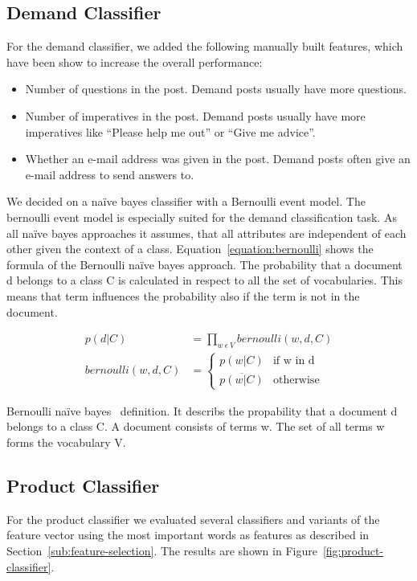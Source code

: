 \subsection{Demand Classifier}
For the demand classifier, we added the following manually built features, which have been show to increase the overall performance:
\begin{itemize}
	\item Number of questions in the post. Demand posts usually have more questions.
	\item Number of imperatives in the post. Demand posts usually have more imperatives like ``Please help me out'' or ``Give me advice''.
	\item Whether an e-mail address was given in the post. Demand posts often give an e-mail address to send answers to.
\end{itemize}

We decided on a na\"{i}ve bayes classifier with a Bernoulli event model.
The bernoulli event model is especially suited for the demand classification task.
As all na\"{i}ve bayes approaches it assumes, that all attributes are independent of each other given the context of a class.
Equation~\ref{equation:bernoulli} shows the formula of the Bernoulli na\"{i}ve bayes approach.
The probability that a document d belongs to a class C is calculated in respect to all the set of vocabularies.
This means that term influences the probability also if the term is not in the document.

\captionsetup{singlelinecheck=off}
\begin{equationBlock}
\begin{align*}
	p(d|C) &= \prod_{w~\epsilon~V} bernoulli(w, d, C) \\
	bernoulli(w, d, C) &=
	\begin{cases}
		p(w|C) 					&\text{if w in d}\\
		\overline{p(w|C)} 		&\text{otherwise}
	\end{cases}
	\end{align*}
	\caption{
		Bernoulli na\"{i}ve bayes~\cite{mccallum1998comparison} definition. 
		It describs the propability that a document d belongs to a class C. 
		A document consists of terms w. 
		The set of all terms w forms the vocabulary V. 
	}
	\label{equation:bernoulli}
\end{equationBlock}

\subsection{Product Classifier}
For the product classifier we evaluated several classifiers and variants of the feature vector using the most important words as features as described in Section~\ref{sub:feature-selection}.
The results are shown in Figure~\ref{fig:product-classifier}.

